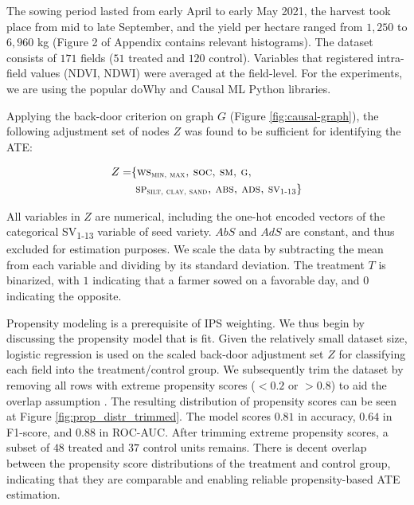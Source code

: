 \documentclass[letterpaper]{article} %
\begin{document}
The sowing period lasted from early April to early May 2021, the harvest took place from mid to late September, and the yield per hectare ranged from $1,250$ to $6,960$ kg (Figure 2 of Appendix contains relevant histograms).
The dataset consists of $171$ fields ($51$ treated and $120$ control).
Variables that registered intra-field values (NDVI, NDWI) were averaged at the field-level. For the experiments, we are using the popular doWhy \cite{sharma2020dowhy} and Causal ML \cite{chen2020causalml} Python libraries.

Applying the back-door criterion on graph $G$ (Figure \ref{fig:causal-graph}), the following adjustment set of nodes $Z$ was found to be sufficient for identifying the ATE:

\begin{equation}
\begin{aligned}
Z = & \{\textsc{ws\textsubscript{min, max}, soc, sm, g, } \\
& \textsc{  sp\textsubscript{silt, clay, sand}, abs, ads, sv\textsubscript{1-13}} \}
\end{aligned}
\end{equation}

\noindent All variables in $Z$ are numerical, including the one-hot encoded vectors of the categorical \textsc{SV}\textsubscript{1-13} variable of seed variety. $AbS$ and $AdS$ are constant, and thus excluded for estimation purposes. We scale the data by subtracting the mean from each variable and dividing by its standard deviation. The treatment $T$ is binarized, with $1$ indicating that a farmer sowed on a favorable day, and $0$ indicating the opposite.

Propensity modeling is a prerequisite of IPS weighting. We thus begin by discussing the propensity model that is fit. Given the relatively small dataset size,
logistic regression is used on the scaled back-door adjustment set $Z$ for classifying each field into the treatment/control group. We subsequently trim the dataset by removing all rows with extreme propensity scores ($<0.2$ or $>0.8$) to aid the overlap assumption
\cite{imbens2015causal}. The resulting distribution of propensity scores can be seen at Figure \ref{fig:prop_distr_trimmed}. The model scores $0.81$ in accuracy, $0.64$ in F1-score, and $0.88$ in ROC-AUC.
After trimming extreme propensity scores, a subset of $48$ treated and $37$ control units remains. There is decent overlap between the propensity score distributions of the treatment and control group, indicating that they are comparable and enabling reliable propensity-based ATE estimation.
\end{document}
